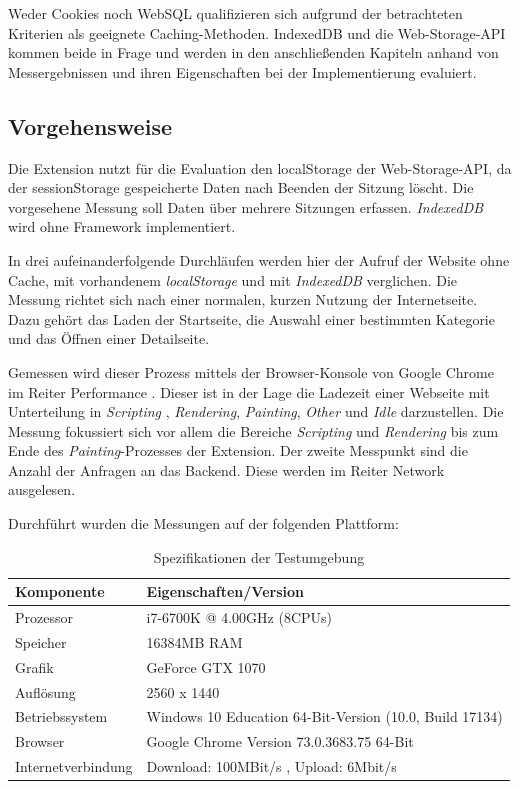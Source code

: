 Weder Cookies noch WebSQL qualifizieren sich aufgrund der betrachteten Kriterien als geeignete Caching-Methoden. IndexedDB und die Web-Storage-API kommen beide in Frage und werden in den anschließenden Kapiteln anhand von Messergebnissen und ihren Eigenschaften bei der Implementierung evaluiert.

\subsection{Vorgehensweise}
\label{ss:vorgehensweise}

Die Extension nutzt für die Evaluation den \glqq localStorage \grqq{} der Web-Storage-API, da der \glqq sessionStorage \grqq{} gespeicherte Daten nach Beenden der Sitzung löscht. Die vorgesehene Messung soll Daten über mehrere Sitzungen erfassen. \textit{IndexedDB} wird ohne Framework implementiert.

In drei aufeinanderfolgende Durchläufen werden hier der Aufruf der Website ohne Cache, mit vorhandenem \textit{localStorage} und mit \textit{IndexedDB} verglichen. Die Messung richtet sich nach einer normalen, kurzen Nutzung der Internetseite. Dazu gehört das Laden der Startseite, die Auswahl einer bestimmten Kategorie und das Öffnen einer Detailseite. 

Gemessen wird dieser Prozess mittels der Browser-Konsole von Google Chrome im Reiter \glqq Performance \grqq{}. Dieser ist in der Lage die Ladezeit einer Webseite mit Unterteilung in \textit{Scripting} , \textit{Rendering}, \textit{Painting}, \textit{Other} und \textit{Idle} darzustellen. Die Messung fokussiert sich vor allem die Bereiche \textit{Scripting} und \textit{Rendering} bis zum Ende des \textit{Painting}-Prozesses der Extension. Der zweite Messpunkt sind die Anzahl der Anfragen an das Backend. Diese werden im Reiter \glqq Network \grqq ausgelesen.

Durchführt wurden die Messungen auf der folgenden Plattform:

\begin{table}[h]
	\begin{tabular}{p{4.6cm}R{7.0cm}}
		\toprule
		\textbf{Komponente}	&	\textbf{Eigenschaften/Version}	\\
		\midrule
		Prozessor	&	i7-6700K @ 4.00GHz (8CPUs)	\\
		Speicher	&	16384MB RAM	\\
		Grafik	&	GeForce GTX 1070	\\
		Auflösung	&	2560 x 1440	\\
		\midrule
		Betriebssystem	&	Windows 10 Education 64-Bit-Version (10.0, Build 17134)	\\
		Browser	&	Google Chrome Version 73.0.3683.75 64-Bit	\\
		Internetverbindung	&	Download: 100MBit/s , Upload: 6Mbit/s	\\
		\bottomrule
	\end{tabular}
	\caption{Spezifikationen der Testumgebung}
	\label{cache3}
\end{table}

